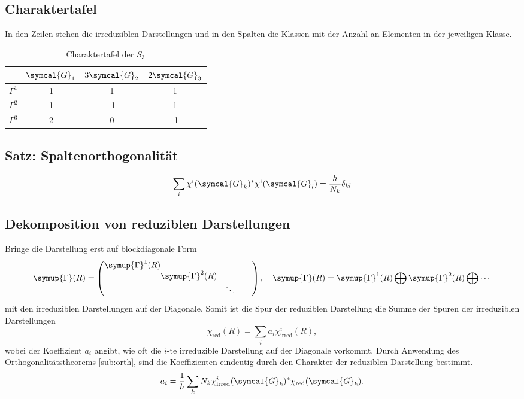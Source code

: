 \documentclass[
  captions=tableheading,  %
  titlepage=firstiscover, %
]{scrartcl}
\begin{document}
\subsection{Charaktertafel}
In den Zeilen stehen die irreduziblen Darstellungen und in den Spalten die Klassen mit 
der Anzahl an Elementen in der jeweiligen Klasse.
\begin{table}
  \centering
  \caption{Charaktertafel der $S_3$}
  \label{tab:some_data}
  \begin{tabular}{S[table-format=10.0] S[table-format = 1.0] S S}
  \toprule
   & {$\symcal{G}_1$} & {$3\symcal{G}_2$} & {$2\symcal{G}_3$} \\
  \midrule
  {$\Gamma^1$} & 1 & 1  & 1   \\
  {$\Gamma^2$} & 1 & -1 & 1   \\
  {$\Gamma^3$} & 2 & 0  & -1  \\
  \bottomrule
  \end{tabular}
  \end{table}
\subsection{Satz: Spaltenorthogonalität}
\begin{equation*}
  \sum_i \chi^i(\symcal{G}_k)^* \chi^i(\symcal{G}_l) = \frac{h}{N_k} \delta_{kl}
\end{equation*}
\subsection{Dekomposition von reduziblen Darstellungen}
Bringe die Darstellung erst auf blockdiagonale Form
\begin{equation*}
  \symup{\Gamma} (R) = 
  \begin{pmatrix}
    \symup{\Gamma}^1 (R)  &       &    \\
    & \!\!\!\!\!\! \symup{\Gamma}^2(R) &  \\
    & & \ddots \quad \quad
  \end{pmatrix}
  , \quad \symup{\Gamma} (R) = \symup{\Gamma}^1 (R)\bigoplus \symup{\Gamma}^2(R) \bigoplus \cdots
\end{equation*}
mit den irreduziblen Darstellungen auf der Diagonale.
Somit ist die Spur der reduziblen Darstellung die Summe der Spuren der irreduziblen Darstellungen
\begin{equation*}
  \chi_{\text{red}} (R) = \sum_i a_i \chi_{\text{irred}}^i(R),
\end{equation*}
wobei der Koeffizient $a_i$ angibt, wie oft die $i$-te irreduzible Darstellung auf der 
Diagonale vorkommt.
Durch Anwendung des Orthogonalitätstheorems \ref{sub:orth}, sind die Koeffizienten eindeutig 
durch den Charakter der reduziblen Darstellung bestimmt.
\begin{equation*}
  a_i = \frac{1}{h} \sum_k N_k \chi_{\text{irred}}^i (\symcal{G}_k)^* \chi_{\text{red}} (\symcal{G}_k) . \label{eqn:decomp}
\end{equation*}
\end{document}
